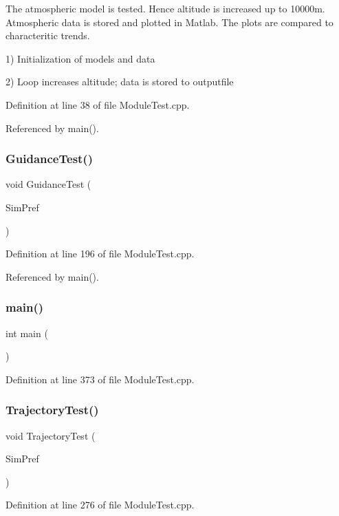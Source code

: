 The atmospheric model is tested. Hence altitude is increased up to 10000m. Atmospheric data is stored and plotted in Matlab. The plots are compared to characteritic trends. 

1) Initialization of models and data

2) Loop increases altitude; data is stored to outputfile 

Definition at line 38 of file Module\+Test.\+cpp.



Referenced by main().

\mbox{\label{group___moduletest_ga506ca9f8cae8f5ef59e2ae58b867384e}} 
\subsubsection{\texorpdfstring{Guidance\+Test()}{GuidanceTest()}}
{\footnotesize\ttfamily void Guidance\+Test (\begin{DoxyParamCaption}\item[{Sim\+D\+Preference \&}]{Sim\+Pref }\end{DoxyParamCaption})}



Definition at line 196 of file Module\+Test.\+cpp.



Referenced by main().

\mbox{\label{group___moduletest_gae66f6b31b5ad750f1fe042a706a4e3d4}} 
\subsubsection{\texorpdfstring{main()}{main()}}
{\footnotesize\ttfamily int main (\begin{DoxyParamCaption}{ }\end{DoxyParamCaption})}



Definition at line 373 of file Module\+Test.\+cpp.

\mbox{\label{group___moduletest_ga3f0bd743f32651aeae72d8d92cd97104}} 
\subsubsection{\texorpdfstring{Trajectory\+Test()}{TrajectoryTest()}}
{\footnotesize\ttfamily void Trajectory\+Test (\begin{DoxyParamCaption}\item[{Sim\+D\+Preference \&}]{Sim\+Pref }\end{DoxyParamCaption})}



Definition at line 276 of file Module\+Test.\+cpp.


